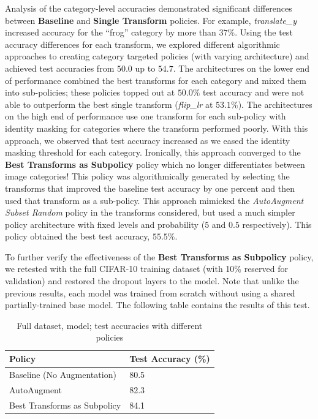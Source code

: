 \documentclass[10pt,twocolumn,letterpaper]{article}
\begin{document}
		Analysis of the category-level accuracies demonstrated significant differences between \textbf{Baseline} and \textbf{Single Transform} policies. For example, \textit{translate\_y} increased accuracy for the ``frog'' category by more than $37\%$. Using the test accuracy differences for each transform, we explored different algorithmic approaches to creating category targeted policies (with varying architecture) and achieved test accuracies from $50.0$ up to $54.7$. The architectures on the lower end of performance combined the best transforms for each category and mixed them into sub-policies; these policies topped out at $50.0\%$ test accuracy and were not able to outperform the best single transform (\textit{flip\_lr} at $53.1\%$). The architectures on the high end of performance use one transform for each sub-policy with identity masking for categories where the transform performed poorly. With this approach, we observed that test accuracy increased as we eased the identity masking threshold for each category. Ironically, this approach converged to the \textbf{Best Transforms as Subpolicy} policy which no longer differentiates between image categories! This policy was algorithmically generated by selecting the transforms that improved the baseline test accuracy by one percent and then used that transform as a sub-policy. This approach mimicked the \textit{AutoAugment Subset Random} policy in the transforms considered, but used a much simpler policy architecture with fixed levels and probability ($5$ and $0.5$ respectively). This policy obtained the best test accuracy, $55.5\%$.

		To further verify the effectiveness of the \textbf{Best Transforms as Subpolicy} policy, we retested with the full CIFAR-10 training dataset (with 10\% reserved for validation) and restored the dropout layers to the model. Note that unlike the previous results, each model was trained from scratch without using a shared partially-trained base model. The following table contains the results of this test.

		\begin{table}[h]
    		\begin{tabular}{l|l}
		        \hline
		        Policy                          &Test Accuracy (\%)   \\ \hline
		        Baseline (No Augmentation)      &80.5 \\
		        AutoAugment                     &82.3 \\
		        Best Transforms as Subpolicy    &84.1 \\
   			\end{tabular}
   		 	\caption{Full dataset, model; test accuracies with different policies}
		\end{table}
\end{document}
